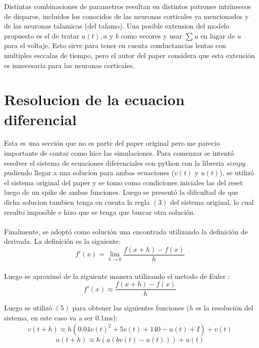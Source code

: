 \documentclass[12pt]{article}
\begin{document}
Distintas combinaciones de parametros resultan en distintos patrones intrinsecos de disparos, incluidos los conocidos de las neuronas corticales ya mencionados y de las neuronas talamicas (del talamo).
Una posible extension del modelo propuesto es el de tratar $u(t), a$ y $b$ como vecores y usar $\sum{u}$ en lugar de $u$ para el voltaje. Esto sirve para tener en cuenta conductancias lentas con multiples esccalas de tiempo, pero el autor del paper considera que esta extensión es innecesaria para las neuronas corticales.

\section{Resolucion de la ecuacion diferencial}

Esta es una sección que no es parte del paper original pero me parecio importante de contar como hice las simulaciones. Para comenzar se intentó resolver el sistema de ecuaciones diferenciales con python con la libreria $simpy$ \cite{Sympy}
pudiendo llegar a una solucion para ambas
ecuaciones ($v(t)$ y $u(t)$), se utilizó el sistema original del paper y se tomo como condiciones iniciales las del reset luego de un spike de ambas funciones.
Luego se presentó la dificultad de que dicha solucion tambien tenga en cuenta la regla $(3)$ del sistema original, lo cual resulto imposible e hizo que se tenga que buscar otra solución. \\ \\
Finalmente, se adoptó como solución una encontrada utilizando la definición de derivada. La definición es la siguiente: \\
\begin{equation}
    f'(x) = \lim_{h \to 0} \frac{f(x + h) - f(x)}{h}
\end{equation}
\\
Luego se aproximó de la siguiente manera utilizando el metodo de Euler \cite{Euler}:
\begin{equation}
    f'(x) \approx \frac{f(x + h) - f(x)}{h}
\end{equation}

Luego se utilizó $(5)$ para obtener las siguientes funciones ($h$ es la resolución del sistema, en este caso va a ser 0.1ms):
\begin{equation}
    v(t + h) \approx h(0.04 v(t)^2 + 5 v(t) + 140 - u(t) + I) + v(t)
\end{equation}
\begin{equation}
    u(t + h) \approx h(a(b v(t) - u(t))) + u(t)
\end{equation}
\end{document}
